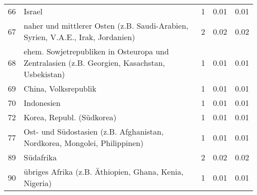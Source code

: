 \begin{longtable}{lXrrr}
        66 & \multicolumn{1}{X}{Israel} & %
          \num{1} &
          \num[round-mode=places,round-precision=2]{0,01} &
          \num[round-mode=places,round-precision=2]{0,01} \\

        67 & \multicolumn{1}{X}{naher und mittlerer Osten (z.B. Saudi-Arabien, Syrien, V.A.E., Irak, Jordanien)} & %
          \num{2} &
          \num[round-mode=places,round-precision=2]{0,02} &
          \num[round-mode=places,round-precision=2]{0,02} \\

        68 & \multicolumn{1}{X}{ehem. Sowjetrepubliken in Osteuropa und Zentralasien (z.B. Georgien, Kasachstan, Usbekistan)} & %
          \num{1} &
          \num[round-mode=places,round-precision=2]{0,01} &
          \num[round-mode=places,round-precision=2]{0,01} \\

        69 & \multicolumn{1}{X}{China, Volksrepublik} & %
          \num{1} &
          \num[round-mode=places,round-precision=2]{0,01} &
          \num[round-mode=places,round-precision=2]{0,01} \\

        70 & \multicolumn{1}{X}{Indonesien} & %
          \num{1} &
          \num[round-mode=places,round-precision=2]{0,01} &
          \num[round-mode=places,round-precision=2]{0,01} \\

        72 & \multicolumn{1}{X}{Korea, Republ. (Südkorea)} & %
          \num{1} &
          \num[round-mode=places,round-precision=2]{0,01} &
          \num[round-mode=places,round-precision=2]{0,01} \\

        77 & \multicolumn{1}{X}{Ost- und Südostasien (z.B. Afghanistan, Nordkorea, Mongolei, Philippinen)} & %
          \num{1} &
          \num[round-mode=places,round-precision=2]{0,01} &
          \num[round-mode=places,round-precision=2]{0,01} \\

        89 & \multicolumn{1}{X}{Südafrika} & %
          \num{2} &
          \num[round-mode=places,round-precision=2]{0,02} &
          \num[round-mode=places,round-precision=2]{0,02} \\

        90 & \multicolumn{1}{X}{übriges Afrika (z.B. Äthiopien, Ghana, Kenia, Nigeria)} & %
          \num{1} &
          \num[round-mode=places,round-precision=2]{0,01} &
          \num[round-mode=places,round-precision=2]{0,01} \\


\end{longtable}
